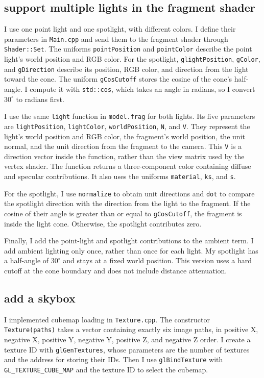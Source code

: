 \documentclass[acmtog]{acmart}
\begin{document}
\subsection{support multiple lights in the fragment shader}
I use one point light and one spotlight, with different colors. I define their parameters in \texttt{Main.cpp} and send them to the fragment shader through \texttt{Shader::Set}. The uniforms \texttt{pointPosition} and \texttt{pointColor} describe the point light's world position and RGB color. For the spotlight, \texttt{glightPosition}, \texttt{gColor}, and \texttt{gDirection} describe its position, RGB color, and direction from the light toward the cone. The uniform \texttt{gCosCutoff} stores the cosine of the cone's half-angle. I compute it with \texttt{std::cos}, which takes an angle in radians, so I convert $30^\circ$ to radians first.

I use the same \texttt{light} function in \texttt{model.frag} for both lights. Its five parameters are \texttt{lightPosition}, \texttt{lightColor}, \texttt{worldPosition}, \texttt{N}, and \texttt{V}. They represent the light's world position and RGB color, the fragment's world position, the unit normal, and the unit direction from the fragment to the camera. This \texttt{V} is a direction vector inside the function, rather than the view matrix used by the vertex shader. The function returns a three-component color containing diffuse and specular contributions. It also uses the uniforms \texttt{material}, \texttt{ks}, and \texttt{s}.

For the spotlight, I use \texttt{normalize} to obtain unit directions and \texttt{dot} to compare the spotlight direction with the direction from the light to the fragment. If the cosine of their angle is greater than or equal to \texttt{gCosCutoff}, the fragment is inside the light cone. Otherwise, the spotlight contributes zero.

Finally, I add the point-light and spotlight contributions to the ambient term. I add ambient lighting only once, rather than once for each light. My spotlight has a half-angle of $30^\circ$ and stays at a fixed world position. This version uses a hard cutoff at the cone boundary and does not include distance attenuation.
\subsection{ add a skybox}
I implemented cubemap loading in \texttt{Texture.cpp}. The constructor \texttt{Texture(paths)} takes a vector containing exactly six image paths, in positive X, negative X, positive Y, negative Y, positive Z, and negative Z order. I create a texture ID with \texttt{glGenTextures}, whose parameters are the number of textures and the address for storing their IDs. Then I use \texttt{glBindTexture} with \texttt{GL\_TEXTURE\_CUBE\_MAP} and the texture ID to select the cubemap.
\end{document}
